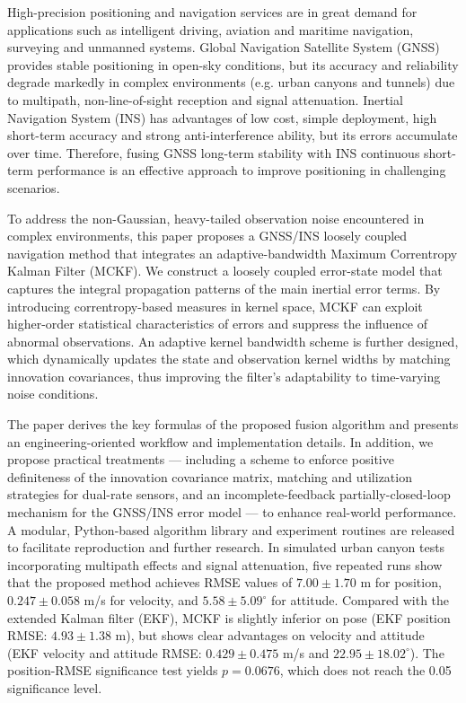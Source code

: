 
\begin{eabstract}
  High-precision positioning and navigation services are in great demand for applications such as intelligent driving, aviation and maritime navigation, surveying and unmanned systems. Global Navigation Satellite System (GNSS) provides stable positioning in open-sky conditions, but its accuracy and reliability degrade markedly in complex environments (e.g. urban canyons and tunnels) due to multipath, non-line-of-sight reception and signal attenuation. Inertial Navigation System (INS) has advantages of low cost, simple deployment, high short-term accuracy and strong anti-interference ability, but its errors accumulate over time. Therefore, fusing GNSS long-term stability with INS continuous short-term performance is an effective approach to improve positioning in challenging scenarios.

  To address the non-Gaussian, heavy-tailed observation noise encountered in complex environments, this paper proposes a GNSS/INS loosely coupled navigation method that integrates an adaptive-bandwidth Maximum Correntropy Kalman Filter (MCKF). We construct a loosely coupled error-state model that captures the integral propagation patterns of the main inertial error terms. By introducing correntropy-based measures in kernel space, MCKF can exploit higher-order statistical characteristics of errors and suppress the influence of abnormal observations. An adaptive kernel bandwidth scheme is further designed, which dynamically updates the state and observation kernel widths by matching innovation covariances, thus improving the filter's adaptability to time-varying noise conditions.

  The paper derives the key formulas of the proposed fusion algorithm and presents an engineering-oriented workflow and implementation details. In addition, we propose practical treatments — including a scheme to enforce positive definiteness of the innovation covariance matrix, matching and utilization strategies for dual-rate sensors, and an incomplete-feedback partially-closed-loop mechanism for the GNSS/INS error model — to enhance real-world performance. A modular, Python-based algorithm library and experiment routines are released to facilitate reproduction and further research. In simulated urban canyon tests incorporating multipath effects and signal attenuation, five repeated runs show that the proposed method achieves RMSE values of $7.00\pm1.70$ m for position, $0.247\pm0.058$ m/s for velocity, and $5.58\pm5.09^\circ$ for attitude. Compared with the extended Kalman filter (EKF), MCKF is slightly inferior on pose (EKF position RMSE: $4.93\pm1.38$ m), but shows clear advantages on velocity and attitude (EKF velocity and attitude RMSE: $0.429\pm0.475$ m/s and $22.95\pm18.02^\circ$). The position-RMSE significance test yields $p=0.0676$, which does not reach the 0.05 significance level.

\end{eabstract}

